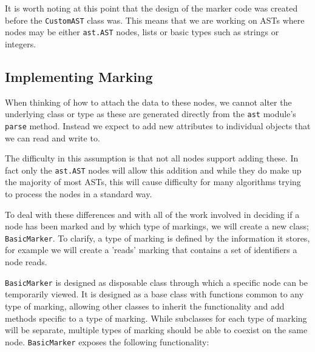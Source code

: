 \documentclass[twoside,a4paper]{report}
\begin{document}
It is worth noting at this point that the design of the marker code was created before the \texttt{CustomAST} class was. This
means that we are working on ASTs where nodes may be either \texttt{ast.AST} nodes, lists or basic types such as strings or
integers.

\subsection{Implementing Marking}

When thinking of how to attach the data to these nodes, we cannot alter the underlying class or type as these are generated directly
from the \texttt{ast} module's \texttt{parse} method. Instead we expect to add new attributes to individual objects that we can read
and write to.

The difficulty in this assumption is that not all nodes support adding these. In fact only the \texttt{ast.AST} nodes will allow this
addition and while they do make up the majority of most ASTs, this will cause difficulty for many algorithms trying to process the
nodes in a standard way.

To deal with these differences and with all of the work involved in deciding if a node has been marked and by which type of markings,
we will create a new class; \texttt{BasicMarker}. To clarify, a type of marking is defined by the information it stores, for example
we will create a 'reads' marking that contains a set of identifiers a node reads.


\texttt{BasicMarker} is designed as disposable class through which a specific node can be temporarily viewed. It is designed as a base
class with functions common to any type of marking, allowing other classes to inherit the functionality and add methods specific to a
type of marking. While subclasses for each type of marking will be separate, multiple types of marking should be able to coexist on the
same node. \texttt{BasicMarker} exposes the following functionality:
\end{document}
